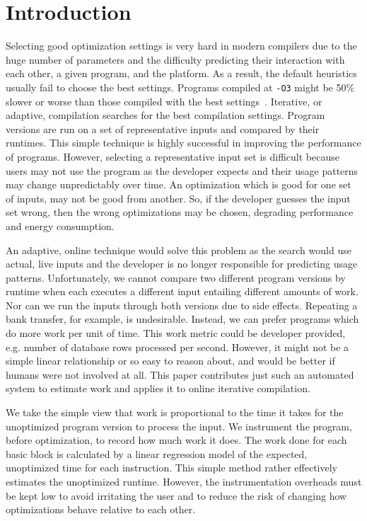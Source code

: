 \section{Introduction}

    Selecting good optimization settings is very hard in modern compilers due to the huge number of parameters and the difficulty
    predicting their interaction with each other, a given program, and the platform. As a result, the default heuristics usually fail to
    choose the best settings. Programs compiled at \texttt{-O3} might be 50\% slower or worse than those compiled with the best
    settings~\cite{fursin07,chen12b}. Iterative, or adaptive, compilation searches for the best compilation settings. Program versions are run
    on a set of representative inputs and compared by their runtimes. This simple technique is highly successful in improving the
    performance of programs. However, selecting a representative input set is difficult because users may not use the program as the
    developer expects and their usage patterns may change unpredictably over time. An optimization which is good for one set of inputs, may
    not be good from another. So, if the developer guesses the input set wrong, then the wrong optimizations may be chosen, degrading
    performance and energy consumption.

    An adaptive, online technique would solve this problem as the search would use actual, live inputs and the developer is no longer
    responsible for predicting usage patterns. Unfortunately, we cannot compare two different program versions by runtime when each
    executes a different input entailing different amounts of work. Nor can we run the inputs through both versions due to side effects.
    Repeating a bank transfer, for example, is undesirable. Instead, we can prefer programs which do more work per unit of time. This work
    metric could be developer provided, e.g. number of database rows processed per second. However, it might not be a simple linear
    relationship or so easy to reason about, and would be better if humans were not involved at all. This paper contributes just such an
    automated system to estimate work and applies it to online iterative compilation.
    
    We take the simple view that work is proportional to the time it takes for the unoptimized program version to process the input. We
    instrument the program, before optimization, to record how much work it does. The work done for each basic block is calculated by a
    linear regression model of the expected, unoptimized time for each instruction. This simple method rather effectively estimates the
    unoptimized runtime. However, the instrumentation overheads must be kept low to avoid irritating the user and to reduce the risk of
    changing how optimizations behave relative to each other.

